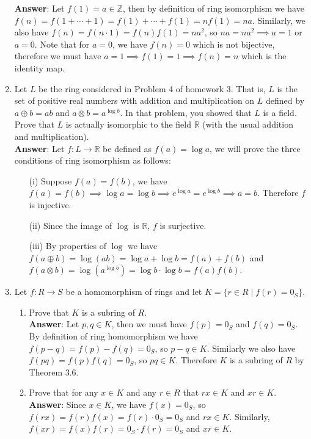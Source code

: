 \documentclass{article}
\begin{document}
\begin{enumerate}
            \textbf{Answer}: Let $f(1)=a\in\mathbb{Z}$, then by definition of ring isomorphism we have $f(n)=f(1+\cdots+1)=f(1)+\cdots+f(1)=nf(1)=na$. Similarly, we also have $f(n)=f(n\cdot 1)=f(n)f(1)=na^2$, so $na=na^2\implies a=1$ or $a=0$. Note that for $a=0$, we have $f(n)=0$ which is not bijective, therefore we must have $a=1\implies f(1)=1\implies f(n)=n$ which is the identity map.
      \item Let $L$ be the ring considered in Problem 4 of homework 3. That is, $L$ is the set of positive real numbers with addition and multiplication on $L$ defined by $a\oplus b=ab$ and $a\otimes b=a^{\log b}$. In that problem, you showed that $L$ is a field. Prove that $L$ is actually isomorphic to the field $\mathbb{R}$ (with the usual addition and multiplication).\\
            \textbf{Answer}: Let $f:L\rightarrow\mathbb{R}$ be defined as $f(a)=\log a$, we will prove the three conditions of ring isomorphism as follows:
            \begin{itemize}
                  \item [(i)] Suppose $f(a)=f(b)$, we have $f(a)=f(b)\implies \log a=\log b\implies e^{\log a}=e^{\log b}\implies a=b$. Therefore $f$ is injective.
                  \item [(ii)] Since the image of $\log$ is $\mathbb{R}$, $f$ is surjective.
                  \item [(iii)] By properties of $\log$ we have $f(a\oplus b)=\log(ab)=\log a+\log b=f(a)+f(b)$ and $f(a\otimes b)=\log(a^{\log b})=\log b\cdot \log b=f(a)f(b)$.
            \end{itemize}
      \item Let $f:R\rightarrow S$ be a homomorphism of rings and let $K=\{r\in R\mid f(r)=0_S\}$.
            \begin{enumerate}
                  \item Prove that $K$ is a subring of $R$.\\
                        \textbf{Answer}: Let $p,q\in K$, then we must have $f(p)=0_S$ and $f(q)=0_S$. By definition of ring homomorphism we have $f(p-q)=f(p)-f(q)=0_S$, so $p-q\in K$. Similarly we also have $f(pq)=f(p)f(q)=0_S$, so $pq\in K$. Therefore $K$ is a subring of $R$ by Theorem 3.6.
                  \item Prove that for any $x\in K$ and any $r\in R$ that $rx\in K$ and $xr\in K$.\\
                        \textbf{Answer}: Since $x\in K$, we have $f(x)=0_S$, so $f(rx)=f(r)f(x)=f(r)\cdot 0_S=0_S$ and $rx\in K$. Similarly, $f(xr)=f(x)f(r)=0_S\cdot f(r)=0_S$ and $xr\in K$.

\end{enumerate}
\end{enumerate}
\end{document}
